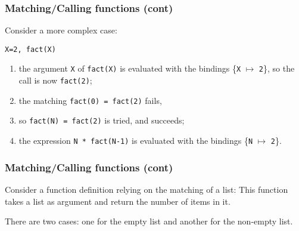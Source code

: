 %
\begin{frame}[containsverbatim]
\frametitle{Matching/Calling functions (cont)}

Consider a more complex case:
\begin{verbatim}
X=2, fact(X)
\end{verbatim}
\begin{enumerate}

  \item the argument \texttt{X} of \texttt{fact(X)} is evaluated with
    the bindings \{\texttt{X} \(\mapsto\) \texttt{2}\}, so the call is
    now \texttt{fact(2)};

  \item the matching \texttt{fact(0) = fact(2)} fails, 

  \item so \texttt{fact(N) = fact(2)} is tried, and succeeds;

  \item the expression \texttt{N * fact(N-1)} is evaluated with the
    bindings \{\texttt{N} \(\mapsto\) \texttt{2}\}.

\end{enumerate}

\end{frame}

%
\begin{frame}
\frametitle{Matching/Calling functions (cont)}

Consider a function definition relying on the matching of a list:
This function takes a list as argument and return the number of items
in it.

\bigskip

There are two cases: one for the empty list and another for the
non-empty list.

\end{frame}
